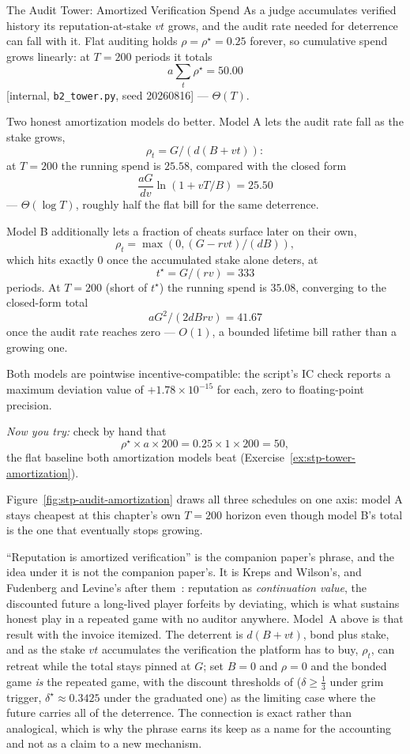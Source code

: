 \documentclass[11pt,a4paper]{article}
\theoremstyle{definition}
\begin{document}
\begin{pdexample}{The Audit Tower: Amortized \mbox{Verification} Spend}
\setlength{\parskip}{4pt plus 1pt}
As a judge accumulates verified history its reputation-at-stake $vt$ grows,
and the audit rate needed for deterrence can fall with it. Flat auditing
holds $\rho=\rho^\star=0.25$ forever, so cumulative spend grows linearly: at
$T=200$ periods it totals
\[
  a\sum_t\rho^\star=50.00
\]
[internal, \texttt{b2\_tower.py}, seed 20260816] --- $\Theta(T)$.

Two honest amortization models do better. Model A lets the audit rate fall
as the stake grows,
\[
  \rho_t=G/(d(B+vt)):
\]
at $T=200$ the running spend is $25.58$, compared with the closed form
\[
  \frac{aG}{dv}\ln(1+vT/B)=25.50
\]
--- $\Theta(\log T)$, roughly half the flat bill for the same deterrence.

Model B
additionally lets a fraction of cheats surface later on their own,
\[
  \rho_t=\max(0,(G-rvt)/(dB)),
\]
which hits exactly $0$ once the accumulated stake alone deters, at
\[
  t^\star=G/(rv)=333
\]
periods. At $T=200$ (short of $t^\star$) the running spend is $35.08$,
converging to the closed-form total
\[
  aG^2/(2dBrv)=41.67
\]
once the audit rate reaches zero --- $O(1)$, a bounded lifetime bill rather
than a growing one.

Both models are pointwise
incentive-compatible: the script's IC check reports a maximum deviation
value of $+1.78\times10^{-15}$ for each, zero to floating-point precision.

\emph{Now you try:} check by hand that
\[
  \rho^\star\times a\times200=0.25\times1\times200=50,
\]
the flat baseline both amortization models
beat (Exercise~\ref{ex:stp-tower-amortization}).
\end{pdexample}

Figure~\ref{fig:stp-audit-amortization} draws all three schedules on one axis:
model A stays cheapest at this chapter's own $T=200$ horizon even though model
B's total is the one that eventually stops growing.



``Reputation is amortized verification'' is the companion paper's phrase, and
the idea under it is not the companion paper's. It is Kreps and Wilson's, and
Fudenberg and Levine's after them~: reputation as \emph{continuation value}, the
discounted future a long-lived player forfeits by deviating, which is what
sustains honest play in a repeated game with no auditor
anywhere. Model~A above is that
result with the invoice itemized. The deterrent is $d(B+vt)$, bond plus stake,
and as the stake $vt$ accumulates the verification the platform has to buy,
$\rho_t$, can retreat while the total stays pinned at $G$; set $B=0$ and
$\rho=0$ and the bonded game \emph{is} the repeated game, with the discount
thresholds of  ($\delta\ge\tfrac13$ under
grim trigger, $\delta^\star\approx0.3425$ under the graduated one) as the
limiting case where the future carries all of the deterrence. The connection
is exact rather than analogical, which is why the phrase earns its keep as a
name for the accounting and not as a claim to a new mechanism.
\end{document}
